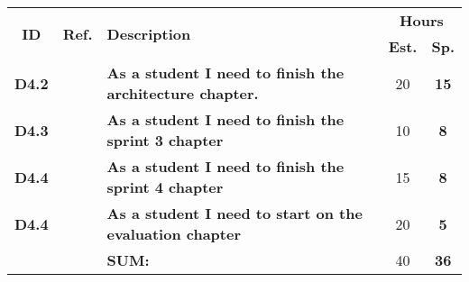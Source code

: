   \label{tab:sprint4Documentationstories}
 \def\arraystretch{1.25}
 
\begin{longtable}{ccXcc}

\toprule[0.5mm]
\multirow{2}{*}{\textbf{ID}} &
\multirow{2}{*}{\textbf{Ref.}} & \multirow{2}{*}{\textbf{Description}} & \multicolumn{2}{c}{\textbf{Hours}} \\
 					& & & \textbf{Est.} & \textbf{Sp.} \\
\midrule


\textbf{D4.2} 	&   & {\bf As a student I need to finish the architecture chapter.} 			& 	20  & \textbf{15} \\
	
\textbf{D4.3} 	&	& {\bf As a student I need to finish the sprint 3 chapter} 					&   10	& \textbf{8} \\

\textbf{D4.4} 	&	& {\bf As a student I need to finish the sprint 4 chapter} 					& 	15 	& \textbf{8} \\

\textbf{D4.4} 	&	& {\bf As a student I need to start on the evaluation chapter} 				& 	20 	& \textbf{5} \\

\midrule
		
				&	& \textbf{SUM:}		&		40	& \textbf{36}
 \\																			
\bottomrule[0.5mm]
\end{longtable}
